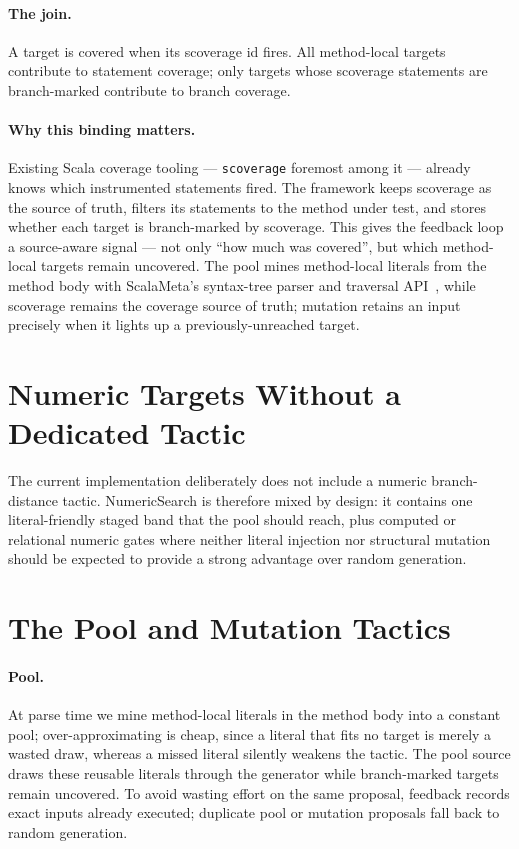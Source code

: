 \documentclass[11pt,a4paper]{report}
\begin{document}
\paragraph{The join.} A target is covered when its scoverage id fires. All method-local targets contribute to
statement coverage; only targets whose scoverage statements are branch-marked contribute to
branch coverage.

\paragraph{Why this binding matters.} Existing Scala coverage tooling — \texttt{scoverage}
foremost among it — already knows which instrumented statements fired. The framework keeps scoverage as the
source of truth, filters its statements to the method under test, and stores whether each target is
branch-marked by scoverage. This gives the feedback loop a source-aware signal — not only ``how much was
covered'', but which method-local targets remain uncovered. The pool mines method-local literals from the method
body with ScalaMeta's syntax-tree parser and traversal API~\cite{scalameta}, while scoverage remains the coverage source of truth; mutation retains an
input precisely when it lights up a previously-unreached target.

\section{Numeric Targets Without a Dedicated Tactic}
\label{sec:gradient}

The current implementation deliberately does not include a numeric branch-distance tactic. NumericSearch is
therefore mixed by design: it contains one literal-friendly staged band that the pool should reach, plus
computed or relational numeric gates where neither literal injection nor structural mutation should be
expected to provide a strong advantage over random generation.

\section{The Pool and Mutation Tactics}
\label{sec:pool-mut}

\paragraph{Pool.} At parse time we mine method-local literals in the method body into a constant pool;
over-approximating is cheap, since a literal that fits no target is merely a wasted draw, whereas a missed
literal silently weakens the tactic. The pool source draws these reusable literals through the generator while
branch-marked targets remain uncovered. To avoid wasting effort on the same proposal, feedback records exact
inputs already executed; duplicate pool or mutation proposals fall back to random generation.
\end{document}
